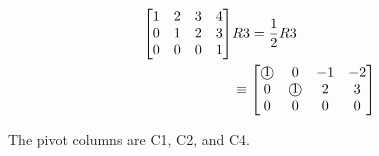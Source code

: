 \documentclass{../mathhomework}
\newcommand{\circnum}[1]{\text{\textcircled{#1}}}
\begin{document}
\begin{problem}[1.2\#3]
\begin{solution}
\begin{align*}
            \begin{bmatrix}
                1 & 2 & 3 & 4 \\
                0 & 1 & 2 & 3 \\
                0 & 0 & 0 & 1
            \end{bmatrix}
            & R3 = \frac{1}{2} R3 \\ & \equiv
            \begin{bmatrix}
                \circnum{1} & 0 & -1 & -2 \\
                0 & \circnum{1} & 2 & 3 \\
                0 & 0 & 0 & 0
            \end{bmatrix}
        \end{align*}

        The pivot columns are C1, C2, and C4.
    \end{solution}
\end{problem}
\end{document}
